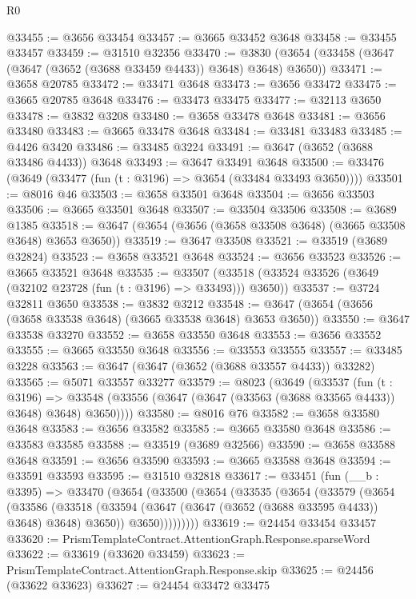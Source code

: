 \begin{lexlean}{R0}
\begin{coremodule}
@33455 := @3656 @33454
@33457 := @3665 @33452 @3648
@33458 := @33455 @33457
@33459 := @31510 @32356
@33470 := @3830 (@3654 (@33458 (@3647 (@3647 (@3652 (@3688 @33459 @4433)) @3648) @3648) @3650))
@33471 := @3658 @20785
@33472 := @33471 @3648
@33473 := @3656 @33472
@33475 := @3665 @20785 @3648
@33476 := @33473 @33475
@33477 := @32113 @3650
@33478 := @3832 @3208
@33480 := @3658 @33478 @3648
@33481 := @3656 @33480
@33483 := @3665 @33478 @3648
@33484 := @33481 @33483
@33485 := @4426 @3420
@33486 := @33485 @3224
@33491 := @3647 (@3652 (@3688 @33486 @4433)) @3648
@33493 := @3647 @33491 @3648
@33500 := @33476 (@3649 (@33477 (fun (t : @3196) => @3654 (@33484 @33493 @3650))))
@33501 := @8016 @46
@33503 := @3658 @33501 @3648
@33504 := @3656 @33503
@33506 := @3665 @33501 @3648
@33507 := @33504 @33506
@33508 := @3689 @1385
@33518 := @3647 (@3654 (@3656 (@3658 @33508 @3648) (@3665 @33508 @3648) @3653 @3650))
@33519 := @3647 @33508
@33521 := @33519 (@3689 @32824)
@33523 := @3658 @33521 @3648
@33524 := @3656 @33523
@33526 := @3665 @33521 @3648
@33535 := @33507 (@33518 (@33524 @33526 (@3649 (@32102 @23728 (fun (t : @3196) => @33493))) @3650))
@33537 := @3724 @32811 @3650
@33538 := @3832 @3212
@33548 := @3647 (@3654 (@3656 (@3658 @33538 @3648) (@3665 @33538 @3648) @3653 @3650))
@33550 := @3647 @33538 @33270
@33552 := @3658 @33550 @3648
@33553 := @3656 @33552
@33555 := @3665 @33550 @3648
@33556 := @33553 @33555
@33557 := @33485 @3228
@33563 := @3647 (@3647 (@3652 (@3688 @33557 @4433)) @33282)
@33565 := @5071 @33557 @33277
@33579 := @8023
    (@3649
      (@33537
        (fun (t : @3196) =>
        @33548 (@33556 (@3647 (@3647 (@33563 (@3688 @33565 @4433)) @3648) @3648) @3650))))
@33580 := @8016 @76
@33582 := @3658 @33580 @3648
@33583 := @3656 @33582
@33585 := @3665 @33580 @3648
@33586 := @33583 @33585
@33588 := @33519 (@3689 @32566)
@33590 := @3658 @33588 @3648
@33591 := @3656 @33590
@33593 := @3665 @33588 @3648
@33594 := @33591 @33593
@33595 := @31510 @32818
@33617 := @33451
    (fun (__b : @3395) =>
    @33470
      (@3654
        (@33500
          (@3654
            (@33535
              (@3654
                (@33579
                  (@3654
                    (@33586
                      (@33518
                        (@33594 (@3647 (@3647 (@3652 (@3688 @33595 @4433)) @3648) @3648) @3650))
                      @3650)))))))))
@33619 := @24454 @33454 @33457
@33620 := PrismTemplateContract.AttentionGraph.Response.sparseWord
@33622 := @33619 (@33620 @33459)
@33623 := PrismTemplateContract.AttentionGraph.Response.skip
@33625 := @24456 (@33622 @33623)
@33627 := @24454 @33472 @33475

\end{coremodule}
\end{lexlean}
